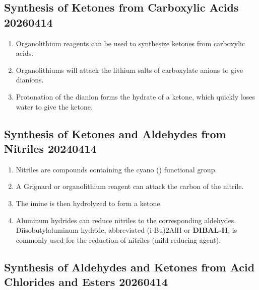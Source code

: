 \subsection{Synthesis of Ketones from Carboxylic Acids 20260414}

\begin{enumerate}
    \item Organolithium reagents can be used to synthesize ketones from carboxylic acids.
    \item Organolithiums will attack the lithium salts of carboxylate anions to give dianions.
    \item Protonation of the dianion forms the hydrate of a ketone, which quickly loses water to give the ketone.
\end{enumerate}

\subsection{Synthesis of Ketones and Aldehydes from Nitriles 20240414}

\begin{enumerate}
    \item Nitriles are compounds containing the cyano () functional group.
    \item A Grignard or organolithium reagent can attack the carbon of the nitrile.
    \item The imine is then hydrolyzed to form a ketone.
    \item Aluminum hydrides can reduce nitriles to the corresponding aldehydes. Diisobutylaluminum hydride, abbreviated (i-Bu)2AlH or \textbf{DIBAL-H}, is commonly used for the reduction of nitriles (mild reducing agent).
\end{enumerate}

\subsection{Synthesis of Aldehydes and Ketones from Acid Chlorides and Esters 20260414}

